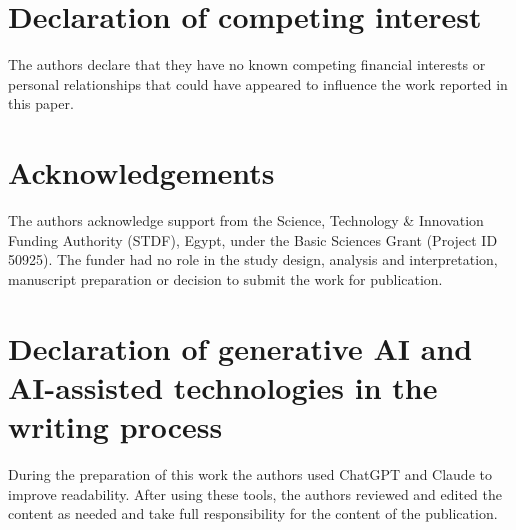 \documentclass[final,3p,11pt]{elsarticle}
\theoremstyle{definition}
\begin{document}
\section*{Declaration of competing interest}
The authors declare that they have no known competing financial interests or personal relationships that could have appeared to influence the work reported in this paper.

\section*{Acknowledgements}
The authors acknowledge support from the Science, Technology \& Innovation Funding Authority (STDF), Egypt, under the Basic Sciences Grant (Project ID 50925). The funder had no role in the study design, analysis and interpretation, manuscript preparation or decision to submit the work for publication.

\section*{Declaration of generative AI and AI-assisted technologies in the writing process}
During the preparation of this work the authors used ChatGPT and Claude to improve readability. After using these tools, the authors reviewed and edited the content as needed and take full responsibility for the content of the publication.




\appendix
{}
%
%
\end{document}
